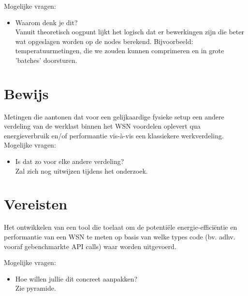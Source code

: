 \documentclass[11pt]{article}
\begin{document}
Mogelijke vragen: 

\begin{itemize}
\item Waarom denk je dit?\\
  Vanuit theoretisch oogpunt lijkt het logisch dat er bewerkingen zijn
die beter wat opgeslagen worden op de nodes berekend. Bijvoorbeeld:
temperatuurmetingen, die we zouden kunnen comprimeren en in grote
'batches' doorsturen.
\end{itemize}
\section{Bewijs}
\label{sec-5}
Metingen die aantonen dat voor een gelijkaardige fysieke setup een
andere verdeling van de werklast binnen het WSN voordelen oplevert qua
energieverbruik en/of performantie vis-à-vis een klassiekere
werkverdeling.\\

Mogelijke vragen: 

\begin{itemize}
\item Is dat zo voor elke andere verdeling?\\
  Zal zich nog uitwijzen tijdens het onderzoek.
\end{itemize}
\section{Vereisten}
\label{sec-6}
Het ontwikkelen van een tool die toelaat om de potentiële
energie-efficiëntie en performantie van een WSN te meten op basis van
welke types code (bv. adhv. vooraf gebenchmarkte API calls) waar
worden uitgevoerd.

Mogelijke vragen: 

\begin{itemize}
\item Hoe willen jullie dit concreet aanpakken?\\
  Zie pyramide.
\end{itemize}
\end{document}
